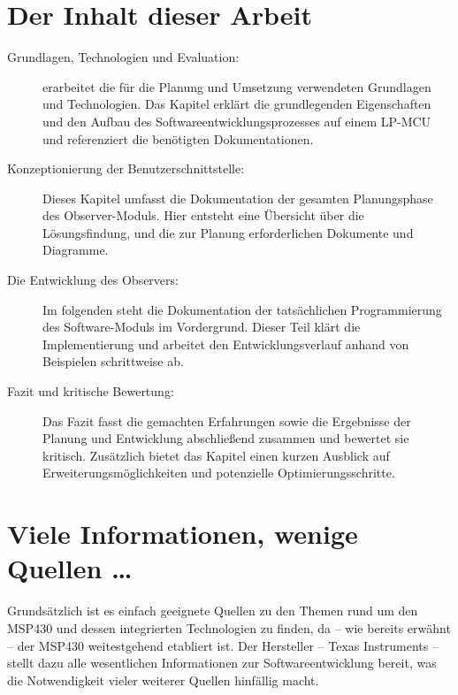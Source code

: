 \newpage
\section{Der Inhalt dieser Arbeit}
\label{sec:AufbauDieserArbeit}

\begin{description}

	\item[Grundlagen, Technologien und Evaluation:]  erarbeitet die f\"ur die Planung und Umsetzung verwendeten Grundlagen und Technologien. Das Kapitel erkl\"art die grundlegenden Eigenschaften und den Aufbau des Softwareentwicklungsprozesses auf einem LP-MCU und referenziert die ben\"otigten Dokumentationen.
	
	\item[Konzeptionierung der Benutzerschnittstelle:] Dieses Kapitel umfasst die Dokumentation der gesamten Planungsphase des Observer-Moduls. Hier entsteht eine \"Ubersicht \"uber die L\"osungsfindung, und die zur Planung erforderlichen Dokumente und Diagramme.
	
	\item[Die Entwicklung des Observers:] Im folgenden steht die Dokumentation der tats\"achlichen Programmierung des Software-Moduls im Vordergrund. Dieser Teil kl\"art die Implementierung und arbeitet den Entwicklungsverlauf anhand von Beispielen schrittweise ab.
	
	\item[Fazit und kritische Bewertung:] Das Fazit fasst die gemachten Erfahrungen sowie die Ergebnisse der Planung und Entwicklung abschlie{\ss}end zusammen und bewertet sie kritisch. Zus\"atzlich bietet das Kapitel einen kurzen Ausblick auf Erweiterungsm\"oglichkeiten und potenzielle Optimierungsschritte.

\end{description}

\section{Viele Informationen, wenige Quellen \dots}
\label{sec:Quellenlage}

Grunds\"atzlich ist es einfach geeignete Quellen zu den Themen rund um den MSP430 und dessen integrierten Technologien zu finden, da -- wie bereits erw\"ahnt -- der MSP430 weitestgehend etabliert ist. Der Hersteller -- Texas Instruments -- stellt dazu alle wesentlichen Informationen zur Softwareentwicklung bereit, was die Notwendigkeit vieler weiterer Quellen hinf\"allig macht.